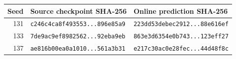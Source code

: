 \begin{tabular}{rll}
\toprule
Seed & Source checkpoint SHA-256 & Online prediction SHA-256 \\
\midrule
131 & \texttt{c246c4ca8f493553...896e85a9} & \texttt{223dd53debec2912...88e616ef} \\
133 & \texttt{7de9ac9ef8982562...92eba9eb} & \texttt{863e3d6354e0b743...123eff27} \\
137 & \texttt{ae816b00ea0a1010...561a3b31} & \texttt{e217c30ac0e28fec...44d48f8c} \\
\bottomrule
\end{tabular}
